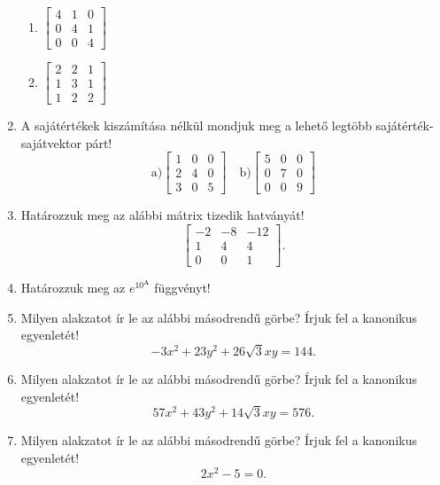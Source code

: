 \documentclass[a4paper, 12pt]{scrartcl}
\begin{document}
\begin{enumerate}
\begin{multicols}{3}
\begin{enumerate}
            \item $ \begin{bmatrix}
                      4 & 1 & 0 \\
                      0 & 4 & 1 \\
                      0 & 0 & 4
                    \end{bmatrix}$

            \item $\begin{bmatrix}
                      2 & 2 & 1 \\
                      1 & 3 & 1 \\
                      1 & 2 & 2
                    \end{bmatrix}$
          \end{enumerate}
        \end{multicols}

  \item A sajátértékek kiszámítása nélkül mondjuk meg a lehető legtöbb sajátérték-sajátvektor párt!
        \[
          \text{a)}
          \begin{bmatrix}
            1 & 0 & 0 \\
            2 & 4 & 0 \\
            3 & 0 & 5
          \end{bmatrix} \quad
          \text{b)}
          \begin{bmatrix}
            5 & 0 & 0 \\
            0 & 7 & 0 \\
            0 & 0 & 9
          \end{bmatrix}
        \]

  \item Határozzuk meg az alábbi mátrix tizedik hatványát!
        \[
          \begin{bmatrix}
            -2 & -8 & -12 \\
            1  & 4  & 4   \\
            0  & 0  & 1
          \end{bmatrix}.
        \]

  \item Határozzuk meg az \( e^{10^{\textbf{A}}} \) függvényt!

  \item Milyen alakzatot ír le az alábbi másodrendű görbe? Írjuk fel a kanonikus egyenletét!
        \[
          -3x^2 + 23y^2 + 26\sqrt{3}xy = 144.
        \]

  \item Milyen alakzatot ír le az alábbi másodrendű görbe? Írjuk fel a kanonikus egyenletét!
        \[
          57x^2 + 43y^2 + 14\sqrt{3}xy = 576.
        \]

  \item Milyen alakzatot ír le az alábbi másodrendű görbe? Írjuk fel a kanonikus egyenletét!
        \[
          2x^2 - 5 = 0.
        \]
\end{enumerate}
\end{document}
